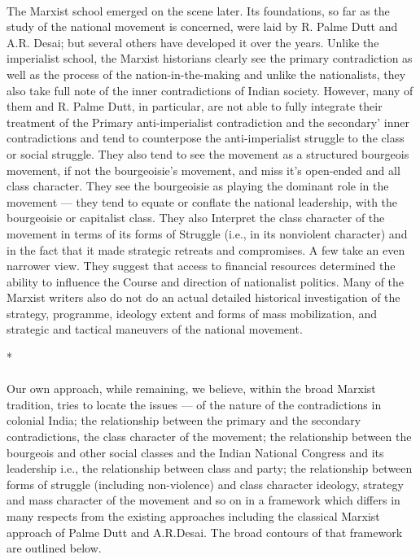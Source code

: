 \paragraph*{}
The Marxist school emerged on the scene later. Its foundations, so far as the study of the national movement is concerned, were laid by R. Palme Dutt and A.R. Desai; but several others have developed it over the years. Unlike the imperialist school, the Marxist historians clearly see the primary contradiction as well as the process of the nation-in-the-making and unlike the nationalists, they also take full note of the inner contradictions of Indian society. However, many of them and R. Palme Dutt, in particular, are not able to fully integrate their treatment of the Primary anti-imperialist contradiction and the secondary' inner contradictions and tend to counterpose the anti-imperialist struggle to the class or social struggle. They also tend to see the movement as a structured bourgeois movement, if not the bourgeoisie's movement, and miss it's open-ended and all class character. They see the bourgeoisie as playing the dominant role in the movement --- they tend to equate or conflate the national leadership, with the bourgeoisie or capitalist class. They also Interpret the class character of the movement in terms of its forms of Struggle (i.e., in its nonviolent character) and in the fact that it made strategic retreats and compromises. A few take an even narrower view. They suggest that access to financial resources determined the ability to influence the Course and direction of nationalist politics. Many of the Marxist writers also do not do an actual detailed historical investigation of the strategy, programme, ideology extent and forms of mass mobilization, and strategic and tactical maneuvers of the national movement.

\begin{center}*\end{center}

\paragraph*{}
Our own approach, while remaining, we believe, within the broad Marxist tradition, tries to locate the issues --- of the nature of the contradictions in colonial India; the relationship between the primary and the secondary contradictions, the class character of the movement; the relationship between the bourgeois and other social classes and the Indian National Congress and its leadership i.e., the relationship between class and party; the relationship between forms of struggle (including non-violence) and class character ideology, strategy and mass character of the movement and so on in a framework which differs in many respects from the existing approaches including the classical Marxist approach of Palme Dutt and A.R.Desai. The broad contours of that framework are outlined below.

